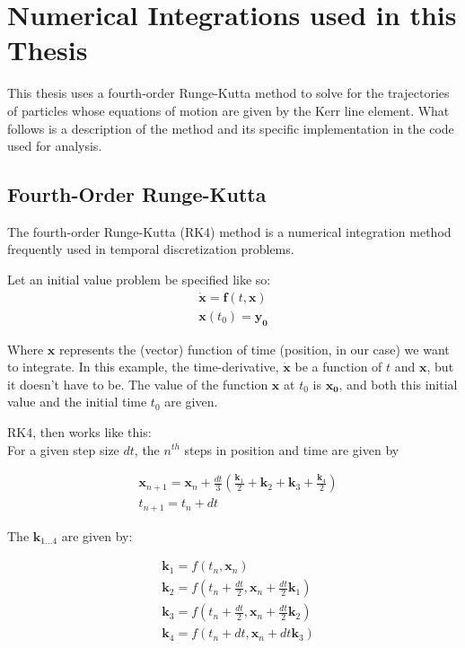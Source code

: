 \documentclass[11pt]{article}
\begin{document}
\section{Numerical Integrations used in this Thesis}

This thesis uses a fourth-order Runge-Kutta method to solve for the trajectories of particles whose equations of motion are given by the Kerr line element.  What follows is a description of the method and its specific implementation in the code used for analysis.

\subsection{Fourth-Order Runge-Kutta}
The fourth-order Runge-Kutta (RK4) method is a numerical integration method frequently used in temporal discretization problems.

Let an initial value problem be specified like so:
\begin{align*}
\mathbf{\dot{x}} = \mathbf{f}(t,\mathbf{x})\\
\mathbf{x}(t_0) = \mathbf{y_0}
\end{align*}

Where $\mathbf{x}$ represents the (vector) function of time (position, in our case) we want to integrate.  In this example, the time-derivative, $\mathbf{\dot{x}}$ be a function of $t$ and $\mathbf{x}$, but it doesn't have to be.  The value of the function $\mathbf{x}$ at $t_0$ is $\mathbf{x_0}$, and both this initial value and the initial time $t_0$ are given.

RK4, then works like this:\\
For a given step size $dt$, the $n^{th}$ steps in position and time are given by

\begin{align}\label{eq:rk4-def}
&\mathbf{x}_{n+1} = \mathbf{x}_n+\frac{dt}{3}\left(\frac{\mathbf{k}_1}{2}+\mathbf{k}_2+\mathbf{k}_3+\frac{\mathbf{k}_4}{2}\right)\\
&t_{n+1} = t_n + dt
\end{align}

The $\mathbf{k}_{1\dots4}$ are given by:

\begin{align}
&\mathbf{k}_1 = f(t_n,\mathbf{x}_n)\\
&\mathbf{k}_2 = f(t_n+\frac{dt}{2},\mathbf{x}_n+\frac{dt}{2}\mathbf{k}_1)\\
&\mathbf{k}_3 = f(t_n+\frac{dt}{2},\mathbf{x}_n+\frac{dt}{2}\mathbf{k}_2)\\
&\mathbf{k}_4 =  f(t_n+dt,\mathbf{x}_n+dt\mathbf{k}_3)
\end{align}
\end{document}
